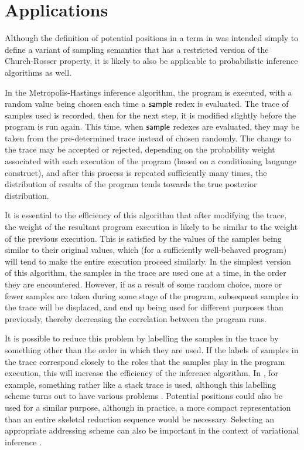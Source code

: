 \section{Applications}
\label{sec:applications}
Although the definition of potential positions in a term in  was intended simply to define a variant of sampling semantics that has a restricted version of the Church-Rosser property, it is likely to also be applicable to probabilistic inference algorithms as well.

In the Metropolis-Hastings inference algorithm, the program is executed, with a random value being chosen each time a $\mathsf{sample}$ redex is evaluated. The trace of samples used is recorded, then for the next step, it is modified slightly before the program is run again. This time, when $\mathsf{sample}$ redexes are evaluated, they may be taken from the pre-determined trace instead of chosen randomly. The change to the trace may be accepted or rejected, depending on the probability weight associated with each execution of the program (based on a conditioning language construct), and after this process is repeated sufficiently many times, the distribution of results of the program tends towards the true posterior distribution.

It is essential to the efficiency of this algorithm that after modifying the trace, the weight of the resultant program execution is likely to be similar to the weight of the previous execution. This is satisfied by the values of the samples being similar to their original values, which (for a sufficiently well-behaved program) will tend to make the entire execution proceed similarly. In the simplest version of this algorithm, the samples in the trace are used one at a time, in the order they are encountered. However, if as a result of some random choice, more or fewer samples are taken during some stage of the program, subsequent samples in the trace will be displaced, and end up being used for different purposes than previously, thereby decreasing the correlation between the program runs.

It is possible to reduce this problem by labelling the samples in the trace by something other than the order in which they are used. If the labels of samples in the trace correspond closely to the roles that the samples play in the program execution, this will increase the efficiency of the inference algorithm. 
In \cite{wingate2011lightweight}, for example, something rather like a stack trace is used, although this labelling scheme turns out to have various problems \cite{kiselyov2016problems}. 
Potential positions could also be used for a similar purpose, although in practice, a more compact representation than an entire skeletal reduction sequence would be necessary. 
Selecting an appropriate addressing scheme can also be important in the context of variational inference \cite[\S 6.2.2]{paige2016automatic}.

